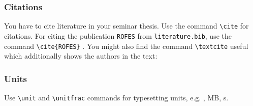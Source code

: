 \subsubsection{Citations}
You have to cite literature in your seminar thesis. Use the command \verb|\cite| for citations. For citing the publication \texttt{ROFES} from \texttt{literature.bib}, use the command \verb|\cite{ROFES}| \cite{ROFES}. You might also find the command \verb|\textcite| useful which additionally shows the authors in the text: \textcite{ROFES}

\subsubsection{Units}
Use \verb|\unit| and \verb|\unitfrac| commands for typesetting units, e.g. , \unit[10]{MB}, \unit[1]{s}.

